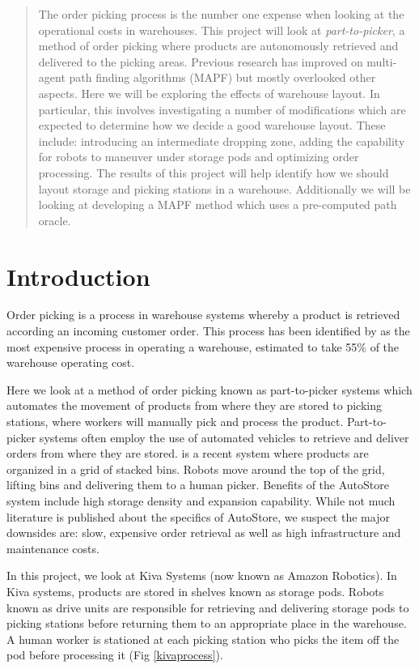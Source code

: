 \documentclass[a4paper,11pt]{article}
\begin{document}
	\begin{abstract} %
	
	\noindent The order picking process is the number one expense when looking at the operational costs in warehouses. This project will look at \textit{part-to-picker}, a method of order picking where products are autonomously retrieved and delivered to the picking areas. Previous research has improved on multi-agent path finding algorithms (MAPF) but mostly overlooked other aspects.
	Here we will be exploring the effects of warehouse layout.
	In particular, this involves investigating a number of modifications which are expected to determine how we decide a good warehouse layout. These include: introducing an intermediate dropping zone, adding the capability for robots to maneuver under storage pods and optimizing order processing.
	The results of this project will help identify how we should layout storage and picking stations in a warehouse. Additionally we will be looking at developing a MAPF method which uses a pre-computed path oracle.
	
\end{abstract}
\section{Introduction}
Order picking is a process in warehouse systems whereby a product is retrieved according an incoming customer order. This process has been identified by \cite{de2007design} as the most expensive process in operating a warehouse, estimated to take 55\% of the warehouse operating cost.

Here we look at a method of order picking known as part-to-picker systems which automates the movement of products from where they are stored to picking stations, where workers will manually pick and process the product. Part-to-picker systems often employ the use of automated vehicles to retrieve and deliver orders from where they are stored. \cite{introduction2015autostore} is a recent system where products are organized in a grid of stacked bins. Robots move around the top of the grid, lifting bins and delivering them to a human picker. Benefits of the AutoStore system include high storage density and expansion capability. While not much literature is published about the specifics of AutoStore, we suspect the major downsides are: slow, expensive order retrieval as well as high infrastructure and maintenance costs.

In this project, we look at Kiva Systems (now known as Amazon Robotics). In Kiva systems, products are stored in shelves known as storage pods. Robots known as drive units are responsible for retrieving and delivering storage pods to picking stations before returning them to an appropriate place in the warehouse. A human worker is stationed at each picking station who picks the item off the pod before processing it (Fig \ref{kivaprocess}).
\end{document}
